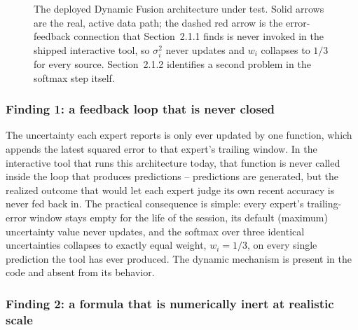 \documentclass[10pt,a4paper,twocolumn]{article}
\begin{document}
\begin{figure}[t]
\caption{The deployed Dynamic Fusion architecture under test. Solid arrows are the real, active data path; the dashed red arrow is the error-feedback connection that Section~2.1.1 finds is never invoked in the shipped interactive tool, so $\sigma_i^2$ never updates and $w_i$ collapses to $1/3$ for every source. Section~2.1.2 identifies a second problem in the softmax step itself.}
\label{fig:arch}
\end{figure}

\subsubsection{Finding 1: a feedback loop that is never closed}

The uncertainty each expert reports is only ever updated by one function, which appends the latest squared error to that expert's trailing window. In the interactive tool that runs this architecture today, that function is never called inside the loop that produces predictions -- predictions are generated, but the realized outcome that would let each expert judge its own recent accuracy is never fed back in. The practical consequence is simple: every expert's trailing-error window stays empty for the life of the session, its default (maximum) uncertainty value never updates, and the softmax over three identical uncertainties collapses to exactly equal weight, $w_i = 1/3$, on every single prediction the tool has ever produced. The dynamic mechanism is present in the code and absent from its behavior.

\subsubsection{Finding 2: a formula that is numerically inert at realistic scale}
\end{document}
